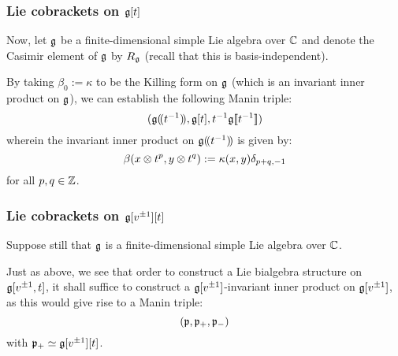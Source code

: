    
        \subsubsection{Lie cobrackets on \texorpdfstring{$\mathfrak{g}[t]$}{}}
            Now, let $\mathfrak{g}$ be a finite-dimensional simple Lie algebra over $\mathbb{C}$ and denote the Casimir element of $\mathfrak{g}$ by $R_{\mathfrak{g}}$ (recall that this is basis-independent). 

            By taking $\beta_0 := \kappa$ to be the Killing form on $\mathfrak{g}$ (which is an invariant inner product on $\mathfrak{g}$), we can establish the following Manin triple:
                $$( \mathfrak{g}(\!(t^{-1})\!), \mathfrak{g}[t], t^{-1}\mathfrak{g}[\![t^{-1}]\!] )$$
            wherein the invariant inner product on $\mathfrak{g}(\!(t^{-1})\!)$ is given by:
                $$\beta(x \tensor t^p, y \tensor t^q) := \kappa(x, y) \delta_{p + q, -1}$$
            for all $p, q \in \mathbb{Z}$. 

        \subsubsection{Lie cobrackets on \texorpdfstring{$\mathfrak{g}[v^{\pm 1}][t]$}{}}
            Suppose still that $\mathfrak{g}$ is a finite-dimensional simple Lie algebra over $\mathbb{C}$.
        
            Just as above, we see that order to construct a Lie bialgebra structure on $\mathfrak{g}[v^{\pm 1}, t]$, it shall suffice to construct a $\mathfrak{g}[v^{\pm 1}]$-invariant inner product on $\mathfrak{g}[v^{\pm 1}]$, as this would give rise to a Manin triple:
                $$(\mathfrak{p}, \mathfrak{p}_+, \mathfrak{p}_-)$$
            with $\mathfrak{p}_+ \simeq \mathfrak{g}[v^{\pm 1}][t]$.
                

